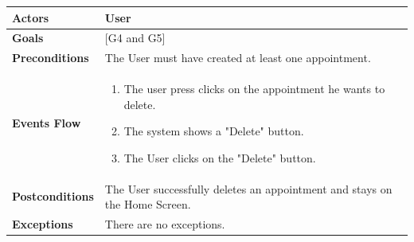 \documentclass[12pt]{article}
\begin{document}
\begin{center}
    \begin{tabular} { |p{}|p{}| }
        \hline
        \textbf{Actors} & User \\ 
        \hline
        \textbf{Goals} & {[G4 and G5]} \\ 
        \hline  
        \textbf{Preconditions} & The User must have created at least one appointment. \\ 
        \hline
        \textbf{Events Flow} & \begin{enumerate} 
                            \setlength{\itemsep}{0.5pt}
                            \item The user press clicks on the appointment he wants to delete.
                            \item The system shows a "Delete" button.
                            \item The User clicks on the "Delete" button.
                            \end{enumerate} \\
        \hline
        \textbf{Postconditions} & The User successfully deletes an appointment and stays on the Home Screen. \\
        \hline
        \textbf{Exceptions} & There are no exceptions.\\ 
        \hline
    \end{tabular}
\end{center}
\end{document}
